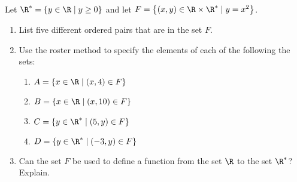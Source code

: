 \begin{previewactivity} \label{PA:orderedpairs} \hfill \\
Let $\R^* = \left\{ y \in \R \mid y \geq 0 \right\}$ and let
$F = \left\{ (x, y) \in \R \times \R^* \mid y = x^2 \right\}$.

\begin{enumerate}
\item List five different ordered pairs that are in the set $F$.

\item Use the roster method to specify the elements of each of the following the sets:
\begin{multicols}{2}
\begin{enumerate}
\item $A = \left\{ x \in \R \mid (x, 4) \in F \right\}$
\item $B = \left\{ x \in \R \mid (x, 10) \in F \right\}$
\item $C = \left\{ y \in \R^* \mid (5, y) \in F \right\}$
\item $D = \left\{ y \in \R^* \mid (-3, y) \in F \right\}$
\end{enumerate}
\end{multicols}

\item Can the set  $F$  be used to define a function from the set  $\R$  to the set  $\R^*$?  Explain.

\end{enumerate}
\end{previewactivity}
\hbreak
\endinput


